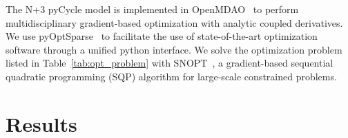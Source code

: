 \documentclass[conf]{new-aiaa}
\begin{document}
The N+3 pyCycle model is implemented in OpenMDAO~\cite{Gray2019a} to perform multidisciplinary gradient-based optimization with analytic coupled derivatives.
We use pyOptSparse~\cite{Wu2020a} to facilitate the use of state-of-the-art optimization software through a unified python interface.
We solve the optimization problem listed in Table~\ref{tab:opt_problem} with SNOPT~\cite{Gill2005a}, a gradient-based sequential quadratic programming (SQP) algorithm for large-scale constrained problems.



\section{Results}
\label{sec:results}
\end{document}
